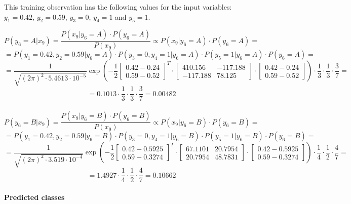 \documentclass{article}
\begin{document}
This training observation has the following values for the input variables: $y_1=0.42$, $y_2=0.59$, $y_3=0$, $y_4=1$ and $y_5=1$.

\[ P(y_6=A|x_9) = \frac{P(x_9|y_6=A) \cdot P(y_6=A)}{P(x_9)} \propto P(x_9|y_6=A) \cdot P(y_6=A) = \]
\[ = P(y_1=0.42,y_2=0.59|y_6=A) \cdot P(y_3=0,y_4=1|y_6=A) \cdot P(y_5=1|y_6=A) \cdot P(y_6=A) = \]
\[ = \frac{1}{\sqrt{(2\pi)^2 \cdot 5.4613 \cdot 10^{-5}}} \exp \left( -\frac{1}{2} \left[ \begin{matrix} 0.42 - 0.24 \\ 0.59 - 0.52 \end{matrix} \right]^T \cdot \begin{bmatrix} 410.156 & -117.188 \\ -117.188 & 78.125 \end{bmatrix} \cdot \left[ \begin{matrix} 0.42 - 0.24 \\ 0.59 - 0.52 \end{matrix} \right] \right) \cdot \frac{1}{3} \cdot \frac{1}{3} \cdot \frac{3}{7} = \]
\[ = 0.1013 \cdot \frac{1}{3} \cdot \frac{1}{3} \cdot \frac{3}{7} = 0.00482 \]

\paragraph{}

\[ P(y_6=B|x_9) = \frac{P(x_9|y_6=B) \cdot P(y_6=B)}{P(x_9)} \propto P(x_9|y_6=B) \cdot P(y_6=B) = \]
\[ = P(y_1=0.42,y_2=0.59|y_6=B) \cdot P(y_3=0,y_4=1|y_6=B) \cdot P(y_5=1|y_6=B) \cdot P(y_6=B) = \]
\[ = \frac{1}{\sqrt{(2\pi)^2 \cdot 3.519 \cdot 10^{-4}}} \exp \left( -\frac{1}{2} \left[ \begin{matrix} 0.42 - 0.5925 \\ 0.59 - 0.3274 \end{matrix} \right]^T \cdot \begin{bmatrix} 67.1101 & 20.7954 \\ 20.7954 & 48.7831 \end{bmatrix} \cdot \left[ \begin{matrix} 0.42 - 0.5925 \\ 0.59 - 0.3274 \end{matrix} \right] \right) \cdot \frac{1}{4} \cdot \frac{1}{2} \cdot \frac{4}{7} = \]
\[ = 1.4927 \cdot \frac{1}{4} \cdot \frac{1}{2} \cdot \frac{4}{7} = 0.10662 \]

\paragraph{Predicted classes}
\end{document}
